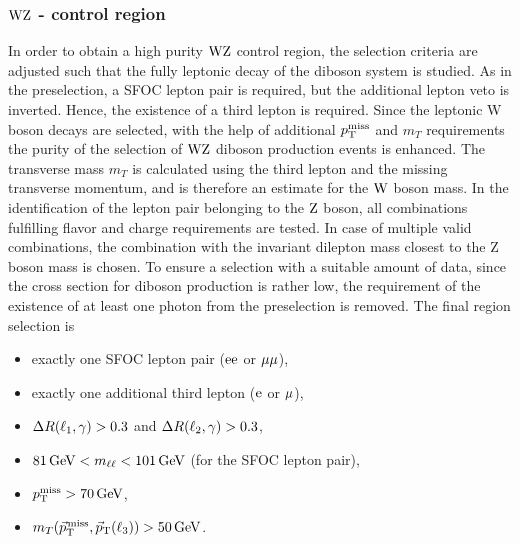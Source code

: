 \subsubsection*{$\mathrm{W}\mathrm{Z}$ - control region}
In order to obtain a high purity $\mathrm{W}\mathrm{Z}$ control region, the selection criteria are adjusted such that the fully leptonic decay of the diboson system is studied. As in the preselection, a SFOC lepton pair is required, but the additional lepton veto is inverted. Hence, the existence of a third lepton is required. Since the leptonic W boson decays are selected, with the help of additional $p_{\mathrm{T}}^\text{miss}$ and $m_{T}$ requirements the purity of the selection of $\mathrm{W}\mathrm{Z}$ diboson production events is enhanced. The transverse mass $m_{T}$ is calculated using the third lepton and the missing transverse momentum, and is therefore an estimate for the $\mathrm{W}$ boson mass. In the identification of the lepton pair belonging to the $\mathrm{Z}$ boson, all combinations fulfilling flavor and charge requirements are tested. In case of multiple valid combinations, the combination with the invariant dilepton mass closest to the Z boson mass is chosen. To ensure a selection with a suitable amount of data, since the cross section for diboson production is rather low, the requirement of the existence of at least one photon from the preselection is removed. The final region selection is
\begin{itemize}
 \item exactly one SFOC lepton pair ($\mathrm{e}\mathrm{e}$ or $\mu\mu$),
 \item exactly one additional third lepton ($\mathrm{e}$ or ${\mu}$),
 \item $\Delta R(\ell_1,\gamma)>0.3$ and $\Delta R(\ell_2,\gamma)>0.3$,
 \item $81\,\text{Ge\hspace{-.08em}V}<m_{\ell\ell}<101\,\text{Ge\hspace{-.08em}V}$ (for the SFOC lepton pair),
 \item $p_{\mathrm{T}}^\text{miss}>70\,\text{Ge\hspace{-.08em}V}$,
 \item $m_{T}({\vec p}_{\mathrm{T}}^{\kern1pt\text{miss}},{\vec p}_{\mathrm{T}}(\ell_3))>50\,\text{Ge\hspace{-.08em}V}$.
\end{itemize}
